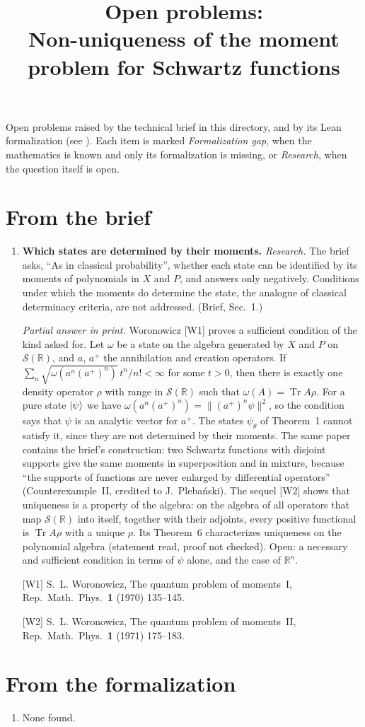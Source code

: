 \documentclass[11pt]{article}
\title{Open problems:\\ Non-uniqueness of the moment problem for Schwartz functions}
\author{}
\date{}
\begin{document}
\maketitle

\noindent
Open problems raised by the technical brief in this directory, and by its Lean formalization
(see ).
Each item is marked \emph{Formalization gap}, when the mathematics is known and only its
formalization is missing, or \emph{Research}, when the question itself is open.

\section*{From the brief}
\begin{enumerate}
\item \textbf{Which states are determined by their moments.} \emph{Research.} The brief asks, ``As in classical
  probability'', whether each state can be identified by its moments of polynomials in $X$ and
  $P$, and answers only negatively. Conditions under which the moments do determine the state,
  the analogue of classical determinacy criteria, are not addressed. (Brief, Sec.~1.)

  \emph{Partial answer in print.} Woronowicz [W1] proves a sufficient condition of the kind asked
  for. Let $\omega$ be a state on the algebra generated by $X$ and $P$ on
  $\mathcal{S}(\mathbb{R})$, and $a$, $a^+$ the annihilation and creation operators. If
  $\sum_n \sqrt{\omega(a^n (a^+)^n)}\, t^n / n! < \infty$ for some $t > 0$, then there is exactly
  one density operator $\rho$ with range in $\mathcal{S}(\mathbb{R})$ such that
  $\omega(A) = \operatorname{Tr} A\rho$. For a pure state $\ket{\psi}$ we have
  $\omega(a^n (a^+)^n) = \|(a^+)^n \psi\|^2$, so the condition says that $\psi$ is an analytic
  vector for $a^+$. The states $\psi_\theta$ of Theorem~1 cannot satisfy it, since they are not
  determined by their moments. The same paper contains the brief's construction: two Schwartz
  functions with disjoint supports give the same moments in superposition and in mixture, because
  ``the supports of functions are never enlarged by differential operators'' (Counterexample~II,
  credited to J.~Pleba\'nski). The sequel [W2] shows that uniqueness is a property of the algebra:
  on the algebra of all operators that map $\mathcal{S}(\mathbb{R})$ into itself, together with
  their adjoints, every positive functional is $\operatorname{Tr} A\rho$ with a unique $\rho$.
  Its Theorem~6 characterizes uniqueness on the polynomial algebra (statement read, proof not
  checked). Open: a necessary and sufficient condition in terms of $\psi$ alone, and the case of
  $\mathbb{R}^n$.

  [W1] S.~L. Woronowicz, The quantum problem of moments~I, Rep.\ Math.\ Phys.\ \textbf{1} (1970)
  135--145.

  [W2] S.~L. Woronowicz, The quantum problem of moments~II, Rep.\ Math.\ Phys.\ \textbf{1} (1971)
  175--183.
\end{enumerate}

\section*{From the formalization}
\begin{enumerate}
\item None found.
\end{enumerate}
\end{document}

